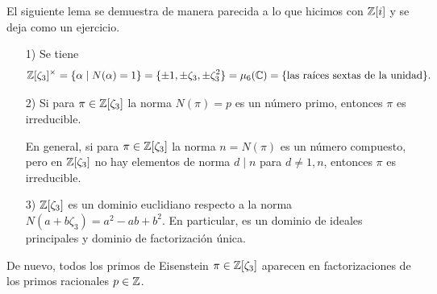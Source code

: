 El siguiente lema se demuestra de manera parecida a lo que hicimos con $\mathbb{Z} [i]$
y se deja como un ejercicio.

\begin{lema}
  \begin{enumerate}
  \item[1)] Se tiene
    \[ \mathbb{Z} [\zeta_3]^\times = \{ \alpha \mid N (\alpha) = 1 \}
           = \{ \pm 1, \pm \zeta_3, \pm \zeta_3^2 \}
           = \mu_6 (\mathbb{C})
           = \{ \text{las raíces sextas de la unidad} \}. \]

  \item[2)] Si para $\pi \in \mathbb{Z} [\zeta_3]$ la norma $N (\pi) = p$ es un número
    primo, entonces $\pi$ es irreducible.

    En general, si para $\pi \in \mathbb{Z} [\zeta_3]$ la norma $n = N (\pi)$ es
    un número compuesto, pero en $\mathbb{Z} [\zeta_3]$ no hay elementos de norma
    $d \mid n$ para $d \ne 1, n$, entonces $\pi$ es irreducible.

  \item[3)] $\mathbb{Z} [\zeta_3]$ es un dominio euclidiano respecto a la norma
    $N (a + b\zeta_3) = a^2 - ab + b^2$. En particular, es un dominio de ideales
    principales y dominio de factorización única.
  \end{enumerate}
\end{lema}

De nuevo, todos los primos de Eisenstein $\pi \in \mathbb{Z} [\zeta_3]$ aparecen en
factorizaciones de los primos racionales $p \in \mathbb{Z}$.

